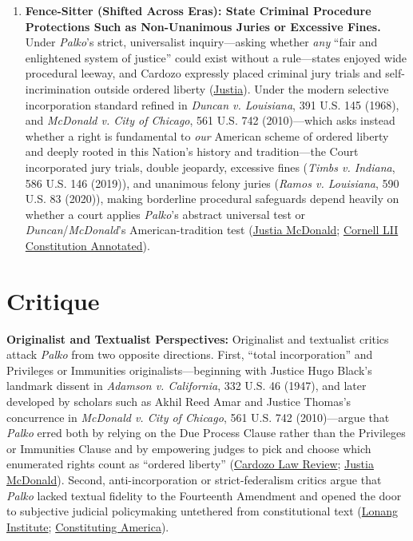 \documentclass[12pt]{article}
\begin{document}
\begin{enumerate}
    \item \textbf{Fence-Sitter (Shifted Across Eras): State Criminal Procedure Protections Such as Non-Unanimous Juries or Excessive Fines.} Under \textit{Palko}'s strict, universalist inquiry---asking whether \textit{any} ``fair and enlightened system of justice'' could exist without a rule---states enjoyed wide procedural leeway, and Cardozo expressly placed criminal jury trials and self-incrimination outside ordered liberty (\href{https://supreme.justia.com/cases/federal/us/302/319/}{Justia}). Under the modern selective incorporation standard refined in \textit{Duncan v. Louisiana}, 391 U.S. 145 (1968), and \textit{McDonald v. City of Chicago}, 561 U.S. 742 (2010)---which asks instead whether a right is fundamental to \textit{our} American scheme of ordered liberty and deeply rooted in this Nation's history and tradition---the Court incorporated jury trials, double jeopardy, excessive fines (\textit{Timbs v. Indiana}, 586 U.S. 146 (2019)), and unanimous felony juries (\textit{Ramos v. Louisiana}, 590 U.S. 83 (2020)), making borderline procedural safeguards depend heavily on whether a court applies \textit{Palko}'s abstract universal test or \textit{Duncan}/\textit{McDonald}'s American-tradition test (\href{https://supreme.justia.com/cases/federal/us/561/742/}{Justia McDonald}; \href{https://www.law.cornell.edu/constitution-conan/amendment-14/modern-doctrine-on-selective-incorporation-of-bill-of-rights}{Cornell LII Constitution Annotated}).
\end{enumerate}

\section{Critique}

\textbf{Originalist and Textualist Perspectives:} Originalist and textualist critics attack \textit{Palko} from two opposite directions. First, ``total incorporation'' and Privileges or Immunities originalists---beginning with Justice Hugo Black's landmark dissent in \textit{Adamson v. California}, 332 U.S. 46 (1947), and later developed by scholars such as Akhil Reed Amar and Justice Thomas's concurrence in \textit{McDonald v. City of Chicago}, 561 U.S. 742 (2010)---argue that \textit{Palko} erred both by relying on the Due Process Clause rather than the Privileges or Immunities Clause and by empowering judges to pick and choose which enumerated rights count as ``ordered liberty'' (\href{https://www.cardozolawreview.com/interrogating-the-nonincorporation-of-the-grand-jury-clause/}{Cardozo Law Review}; \href{https://supreme.justia.com/cases/federal/us/561/742/}{Justia McDonald}). Second, anti-incorporation or strict-federalism critics argue that \textit{Palko} lacked textual fidelity to the Fourteenth Amendment and opened the door to subjective judicial policymaking untethered from constitutional text (\href{https://lonang.com/commentaries/conlaw/bill-of-rights/the-incorporation-doctrine/}{Lonang Institute}; \href{https://constitutingamerica.org/palko-v-connecticut-1937-guest-essayist-robert-lowry-clinton/}{Constituting America}).
\end{document}
